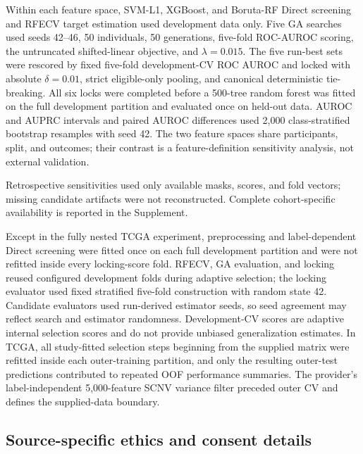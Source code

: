Within each feature space, SVM-L1, XGBoost, and Boruta-RF Direct screening and RFECV target estimation used development data only. Five GA searches used seeds 42--46, 50 individuals, 50 generations, five-fold ROC-AUROC scoring, the untruncated shifted-linear objective, and \(\lambda=0.015\). The five run-best sets were rescored by fixed five-fold development-CV ROC AUROC and locked with absolute \(\delta=0.01\), strict eligible-only pooling, and canonical deterministic tie-breaking. All six locks were completed before a 500-tree random forest was fitted on the full development partition and evaluated once on held-out data. AUROC and AUPRC intervals and paired AUROC differences used 2,000 class-stratified bootstrap resamples with seed 42. The two feature spaces share participants, split, and outcomes; their contrast is a feature-definition sensitivity analysis, not external validation.

Retrospective sensitivities used only available masks, scores, and fold vectors; missing candidate artifacts were not reconstructed. Complete cohort-specific availability is reported in the Supplement.

Except in the fully nested TCGA experiment, preprocessing and label-dependent Direct screening were fitted once on each full development partition and were not refitted inside every locking-score fold. RFECV, GA evaluation, and locking reused configured development folds during adaptive selection; the locking evaluator used fixed stratified five-fold construction with random state 42. Candidate evaluators used run-derived estimator seeds, so seed agreement may reflect search and estimator randomness. Development-CV scores are adaptive internal selection scores and do not provide unbiased generalization estimates. In TCGA, all study-fitted selection steps beginning from the supplied matrix were refitted inside each outer-training partition, and only the resulting outer-test predictions contributed to repeated OOF performance summaries. The provider's label-independent 5,000-feature SCNV variance filter preceded outer CV and defines the supplied-data boundary.

\subsection{Source-specific ethics and consent details}

